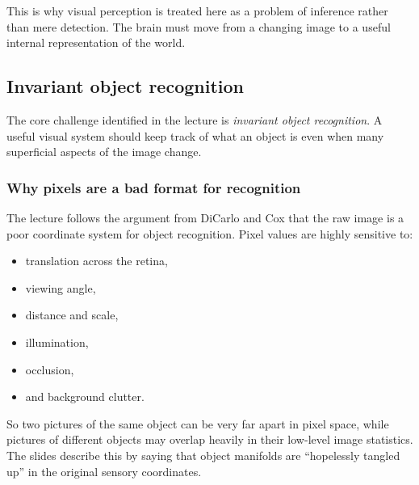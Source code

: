 This is why visual perception is treated here as a problem of inference rather than mere detection. The brain must move from a changing image to a useful internal representation of the world.

\subsection{Invariant object recognition}

The core challenge identified in the lecture is \emph{invariant object recognition}. A useful visual system should keep track of what an object is even when many superficial aspects of the image change.

\subsubsection{Why pixels are a bad format for recognition}

The lecture follows the argument from DiCarlo and Cox that the raw image is a poor coordinate system for object recognition. Pixel values are highly sensitive to:
\begin{itemize}
    \item translation across the retina,
    \item viewing angle,
    \item distance and scale,
    \item illumination,
    \item occlusion,
    \item and background clutter.
\end{itemize}

So two pictures of the same object can be very far apart in pixel space, while pictures of different objects may overlap heavily in their low-level image statistics. The slides describe this by saying that object manifolds are ``hopelessly tangled up'' in the original sensory coordinates.

